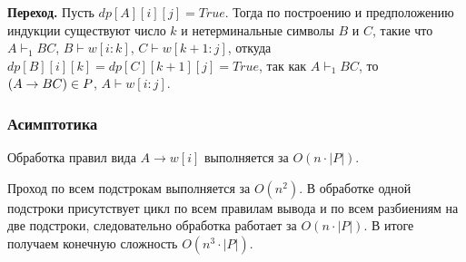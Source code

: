 \textbf{Переход.} Пусть $dp[A][i][j] = True$. Тогда по построению и предположению индукции существуют число $k$ и нетерминальные символы $B$ и $C$, такие что $A \vdash_1 BC$, $B \vdash w[i:k]$, $C \vdash w[k+1:j]$, откуда $dp[B][i][k] = dp[C][k+1][j] = True$, так как $A \vdash_1 BC$, то $\left({A \rightarrow BC}\right) \in P$, $A \vdash w[i : j]$.

\subsubsection*{Асимптотика}

Обработка правил вида $A \rightarrow w[i]$ выполняется за $O(n \cdot |P|)$.

Проход по всем подстрокам выполняется за $O(n^2)$. В обработке одной подстроки присутствует цикл по всем правилам вывода и по всем разбиениям на две подстроки, следовательно обработка работает за $O(n \cdot |P|)$. В итоге получаем конечную сложность $O(n^3 \cdot |P|)$.

